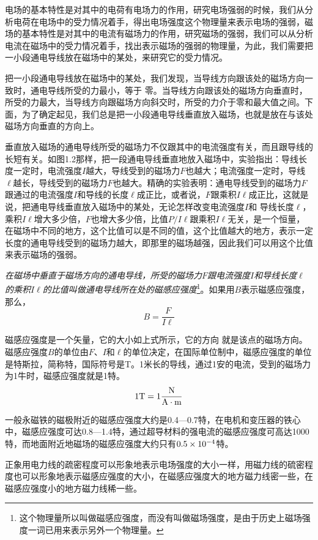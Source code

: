 电场的基本特性是对其中的电荷有电场力的作用，研究电场强弱的时候，我们从分析电荷在电场中的受力情况着手，得出电场强度这个物理量来表示电场的强弱，磁场的基本特性是对其中的电流有磁场力的作用，研究磁场的强弱，我们可以从分析电流在磁场中的受力情况着手，找出表示磁场的强弱的物理量，为此，我们需要把一小段通电导线放在磁场中的某处，来研究它的受力情况。

把一小段通电导线放在磁场中的某处，我们发现，当导线方向跟该处的磁场方向一致时，通电导线所受的力最小，等于
零。当导线方向跟该处的磁场方向垂直时，所受的力最大，当导线方向跟磁场方向斜交时，所受的力介于零和最大值之间。下面，为了确定起见，我们总是把一小段通电导线垂直放入磁场，也就是放在与该处磁场方向垂直的方向上。

垂直放入磁场的通电导线所受的磁场力不仅跟其中的电流强度有关，而且跟导线的长短有关。如图1.2那样，把一段通电导线垂直地放入磁场中，实验指出：导线长度一定时，电流强度$I$越大，导线受到的磁场力$F$也越大；电流强度一定时，导线$\ell$越长，导线受到的磁场力$F$也越大。精确的实验表明：通电导线受到的磁场力$F$跟通过的电流强度$I$和导线的长度$\ell$成正比，或者说，$F$跟乘积$I\ell$成正比，这就是说，把通电导线垂直放入磁场中的某处，无论怎样改变电流强度$I$和
导线长度$\ell$，乘积$I\ell$增大多少倍，$F$也增大多少倍，比值$P/I\ell$跟乘积$I\ell$无关，是一个恒量，在磁场中不同的地方，这个比值可以是不同的值，这个比值越大的地方，表示一定长度的通电导线受到的磁场力越大，即那里的磁场越强，因此我们可以用这个比值来表示磁场的强弱。

\textit{在磁场中垂直于磁场方向的通电导线，所受的磁场力$F$跟电流强度$I$和导线长度$\ell$的乘积$I\ell$的比值叫做通电导线所在处的磁感应强度}\footnote{这个物理量所以叫做磁感应强度，而没有叫做磁场强度，是由于历史上磁场强度一词已用来表示另外一个物理量。}。如果用$B$表示磁感应强度，那么，
\[B=\frac{F}{I\ell}\]

磁感应强度是一个矢量，它的大小如上式所示，它的方向
就是该点的磁场方向。磁感应强度$B$的单位由$F$、$I$和$\ell$的单位决定，在国际单位制中，磁感应强度的单位是特斯拉，简称特，国际符号是T。1米长的导线，通过1安的电流，受到的磁场力为1牛时，磁感应强度就是1特。
\[1{\rm T}=1\frac{\rm N}{\rm A\cdot m}\]

一般永磁铁的磁极附近的磁感应强度大约是0.4—0.7特，在电机和变压器的铁心中，磁感应强度可达0.8—1.4特，通过超导材料的强电流的磁感应强度可高达1000特，而地面附近地磁场的磁感应强度大约只有$0.5\times 10^{-4}$特。

正象用电力线的疏密程度可以形象地表示电场强度的大小一样，用磁力线的硫密程度也可以形象地表示磁感应强度的大小，在磁感应强度大的地方磁力线密一些，在磁感应强度小的地方磁力线稀一些。

